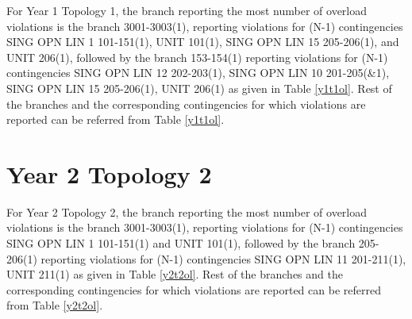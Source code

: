 \documentclass[10pt]{report}
\begin{document}
For Year 1 Topology 1, the branch reporting the most number of overload violations is the branch 3001-3003(1), reporting violations for (N-1) contingencies SING OPN LIN   1 101-151(1), UNIT 101(1), SING OPN LIN   15 205-206(1), and UNIT 206(1), followed by the branch 153-154(1) reporting violations for (N-1) contingencies SING OPN LIN   12 202-203(1), SING OPN LIN   10 201-205(\&1), SING OPN LIN   15 205-206(1), UNIT 206(1) as given in Table \ref{y1t1ol}. Rest of the branches and the corresponding contingencies for which violations are reported can be referred from Table \ref{y1t1ol}. 

\begin{table}[H]
\caption{Branch overload violation count with contingencies - Year 1, Topology 1}
\label{y1t1ol}
\centering
{}
\end{table}

\section{Year 2 Topology 2}

For Year 2 Topology 2, the branch reporting the most number of overload violations is the branch 3001-3003(1), reporting violations for (N-1) contingencies SING OPN LIN   1 101-151(1) and UNIT 101(1), followed by the branch 205-206(1) reporting violations for (N-1) contingencies SING OPN LIN   11 201-211(1), UNIT 211(1) as given in Table \ref{y2t2ol}. Rest of the branches and the corresponding contingencies for which violations are reported can be referred from Table \ref{y2t2ol}. 
\end{document}
